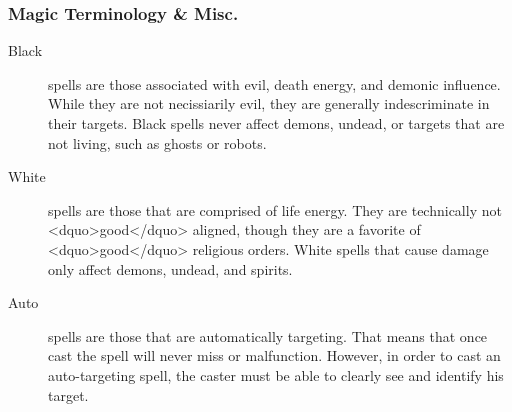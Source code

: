 \subsubsection{Magic Terminology \& Misc.}

\begin{description}
\item[Black] spells are those associated with evil, death energy, and
  demonic influence.  While they are not necissiarily evil, they are
  generally indescriminate in their targets.  Black spells never
  affect demons, undead, or targets that are not living, such as
  ghosts or robots.

\item[White] spells are those that are comprised of life energy.  They
  are technically not <dquo>good</dquo> aligned, though they are a favorite of
  <dquo>good</dquo> religious orders.  White spells that cause damage only
  affect demons, undead, and spirits.

\item[Auto] spells are those that are automatically targeting.  That
  means that once cast the spell will never miss or malfunction.
  However, in order to cast an auto-targeting spell, the caster must
  be able to clearly see and identify his target.

\end{description}
